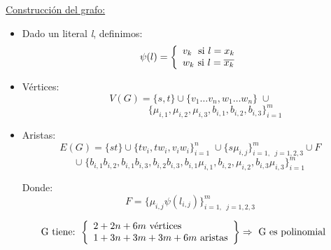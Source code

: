 \documentclass[12pt,a4paper]{report}
\begin{document}
			\vspace{3mm}
			\underline{Construcción del grafo:}
				\begin{itemize}
					\item Dado un literal \textit{l}, definimos:
						\begin{equation*}
							\psi(l) =
	  					\left \lbrace
			  			\begin{array}{l}
	    				 	v_{k} \; \textup{ si } l = x_{k} \\
	    		 			w_{k} \textup{ si } l = \overline{x_{k}}
			  			\end{array}
	  					\right.
						\end{equation*}
					\item Vértices:
						\[ V(G) = \lbrace s, t \rbrace \cup \lbrace v_{1} \dotsc v_{n}, w_{1} \dotsc w_{n} \rbrace \; \cup \]
						\[ \qquad \qquad \; \; \; \; \lbrace \mu_{i, 1}, \mu_{i, 2}, \mu_{i, 3}, b_{i, 1}, b_{i, 2}, b_{i, 3} \rbrace_{i = 1}^{m}  \]
					\item Aristas:
						\[ E(G) = \lbrace s t \rbrace \cup \lbrace t v_{i}, t w_{i}, v_{i} w_{i} \rbrace_{i = 1}^{n} \; \cup \lbrace s \mu_{i, j} \rbrace_{i = 1, \; \; j = 1, 2, 3}^{m} \cup F \]
						\[ \cup \; \lbrace b_{i, 1} b_{i, 2}, b_{i, 1} b_{i, 3}, b_{i, 2} b_{i, 3}, b_{i, 1} \mu_{i, 1}, b_{i, 2}, \mu_{i, 2}, b_{i, 3} \mu_{i, 3} \rbrace_{i = 1}^{m}\]
						\par Donde:
						\[ F = \lbrace \mu_{i, j} \psi(l_{i, j}) \rbrace_{i = 1, \; \; j = 1, 2, 3}^{m}\]
				\end{itemize}

				\begin{equation*}
					\textup{ G tiene: }
	  				\left \lbrace
			  		\begin{array}{l}
	    				2 + 2n + 6m \textup{ vértices} \\
	    				1 + 3n + 3m+ 3m + 6m \textup{ aristas}
			  		\end{array}
	  				\right\rbrace
						\Rightarrow \textup{ G es polinomial}
				\end{equation*}
\end{document}
